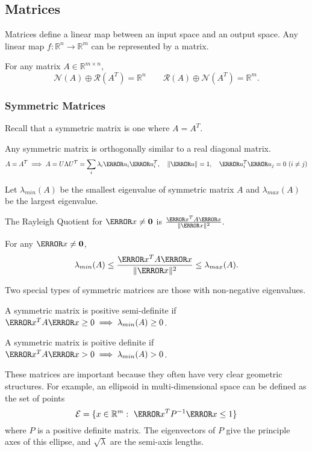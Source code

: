 \subsection{Matrices}
Matrices define a linear map between an input space and an output space. 
Any linear map $f: \mathbb{R}^n \to \mathbb{R}^m$ can be represented by a matrix.
\begin{theorem}
  For any matrix $A\in\mathbb{R}^{m\times n}$,
  \[
	\mathcal{N}(A) \oplus \mathcal{R}(A^T) = \mathbb{R}^n \qquad \mathcal{R}(A) \oplus \mathcal{N}(A^T) = \mathbb{R}^m.
  \]
  \label{thm:fundamental}
\end{theorem}
\subsubsection{Symmetric Matrices}
Recall that a symmetric matrix is one where $A = A^T$.
\begin{theorem}
  Any symmetric matrix is orthogonally similar to a real diagonal matrix.
  \[
	A = A^T \implies A = U \Lambda U^T = \sum_i \lambda_i \V{u}_i\V{u}_i^T,\quad \|\V{u}\| = 1, \quad \V{u}_i^T\V{u}_j = 0 \ (i \ne j)
  \]
  \label{thm:spectral}
\end{theorem}
Let $\lambda_{min}(A)$ be the smallest eigenvalue of symmetric matrix $A$ and $\lambda_{max}(A)$ be the largest eigenvalue.
\begin{definition}
	The Rayleigh Quotient for $\V{x} \ne \bs{0}$ is $\frac{\V{x}^TA\V{x}}{\|\V{x}\|^2}.$
  \label{defn:rayleigh-quotient}
\end{definition}
\begin{theorem}
	For any $\V{x} \ne \bs{0}$,
  \[
		\lambda_{min}(A) \leq \frac{\V{x}^TA\V{x}}{\|\V{x}\|^2} \leq \lambda_{max}(A).
  \]
\end{theorem}
Two special types of symmetric matrices are those with non-negative eigenvalues.
\begin{definition}
  A symmetric matrix is positive semi-definite if $\V{x}^TA\V{x} \geq 0 \implies \lambda_{min}(A) \geq 0$.
  \label{defn:psd-matrix}
\end{definition}
\begin{definition}
  A symmetric matrix is poitive definite if $\V{x}^TA\V{x} > 0 \implies \lambda_{min}(A) > 0$.
  \label{defn:pd-matrix}
\end{definition}
These matrices are important because they often have very clear geometric structures.
For example, an ellipsoid in multi-dimensional space can be defined as the set of points
\[
  \mathcal{E} = \{ x\in\mathbb{R}^m : \ \V{x}^T P^{-1} \V{x} \leq 1 \} 
\]
where $P$ is a positive definite matrix.
The eigenvectors of $P$ give the principle axes of this ellipse, and $\sqrt{\lambda}$ are the semi-axis lengths.
